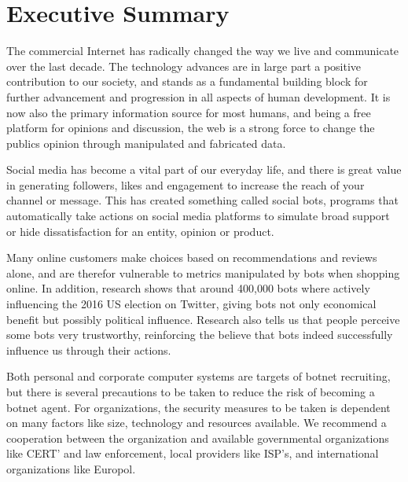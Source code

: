\section*{Executive Summary}
The commercial Internet has radically changed the way we live and communicate over the last decade. The technology advances are in large part a positive contribution to our society, and stands as a fundamental building block for further advancement and progression in all aspects of human development. It is now also the primary information source for most humans, and being a free platform for opinions and discussion, the web is a strong force to change the publics opinion through manipulated and fabricated data. 

Social media has become a vital part of our everyday life, and there is great value in generating followers, likes and engagement to increase the reach of your channel or message. This has created something called social bots, programs that automatically take actions on social media platforms to simulate broad support or hide dissatisfaction for an entity, opinion or product.

Many online customers make choices based on recommendations and reviews alone, and are therefor vulnerable to metrics manipulated by bots when shopping online. In addition, research shows that around 400,000 bots where actively influencing the 2016 US election on Twitter, giving bots not only economical benefit but possibly political influence. Research also tells us that people perceive some bots very trustworthy, reinforcing the believe that bots indeed successfully influence us through their actions.  

Both personal and corporate computer systems are targets of botnet recruiting, but there is several precautions to be taken to reduce the risk of becoming a botnet agent. For organizations, the security measures to be taken is dependent on many factors  like size, technology and resources available. We recommend a cooperation between the organization and available governmental organizations like CERT' and law enforcement, local providers like ISP's, and international organizations like Europol.

